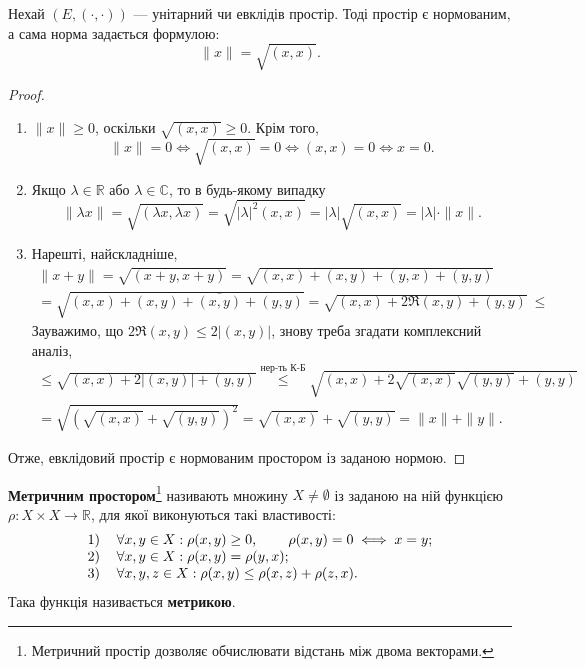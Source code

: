 \documentclass{math_library}
\begin{document}
\begin{proposition}
Нехай $(E,(\cdot,\cdot))$ --- унітарний чи евклідів простір. Тоді простір є нормованим, а сама норма задається формулою: 
\[
\|x\| = \sqrt{(x,x)}.
\]
\end{proposition}

\begin{proof}
\begin{enumerate}[topsep=0pt,wide=0pt,label={\arabic*)}]
\item $\|x\| \geq 0$, оскільки $\sqrt{(x,x)} \geq 0$. Крім того,
\[
\|x\| = 0 \iff \sqrt{(x,x)} = 0 \iff (x,x) = 0 \iff x = 0.
\]
\item Якщо $\lambda \in \mathbb{R}$ або $\lambda \in \mathbb{C}$, то в будь-якому випадку 
\[
\|\lambda x\| = \sqrt{(\lambda x, \lambda x)} = \sqrt{|\lambda|^2 (x,x)} = |\lambda| \sqrt{(x,x)} = |\lambda| \cdot \|x\|.
\]
\item Нарешті, найскладніше,
\begin{align*}
\|x+y\| = \sqrt{(x+y,x+y)} = \sqrt{(x,x) + (x,y) + (y,x) + (y,y)} \\ = \sqrt{(x,x) + (x,y) + \overline{(x,y)} + (y,y)} = \sqrt{(x,x) + 2 \Re (x,y) + (y,y)} \ \boxed{\leq}
\end{align*}
Зауважимо, що $2 \Re (x,y) \leq 2|(x,y)|$, знову треба згадати комплексний аналіз,
\begin{align*}
\boxed{\leq} \sqrt{(x,x) + 2|(x,y)| + (y,y)} \overset{\text{нер-ть К-Б}}{\leq} \sqrt{(x,x) + 2 \sqrt{(x,x)} \sqrt{(y,y)} + (y,y)} \\ = \sqrt{\left(\sqrt{(x,x)}+\sqrt{(y,y)} \right)^2} = \sqrt{(x,x)} + \sqrt{(y,y)} = \|x\| + \|y\|.
\end{align*}
\end{enumerate}
Отже, евклідовий простір є нормованим простором із заданою нормою.
\end{proof}

\begin{definition}
\textbf{Метричним простором}\footnote{Метричний простір дозволяє обчислювати відстань між двома векторами.} називають множину $X \neq \emptyset$ із заданою на ній функцією $\rho \colon X \times X \to \mathbb{R}$, для якої виконуються такі властивості:
\begin{align*}
\begin{tabular}{cl}
1) & $\forall x,y \in X: \rho(x,y) \geq 0$, \qquad $\rho(x,y) = 0 \iff x = y$;\\
2) & $\forall x,y \in X: \rho(x,y) = \rho(y,x)$;\\
3) & $\forall x,y,z \in X: \rho(x,y) \leq \rho(x,z) + \rho(z,x)$.
\end{tabular}
\end{align*}
Така функція називається \textbf{метрикою}.
\end{definition}
\end{document}
